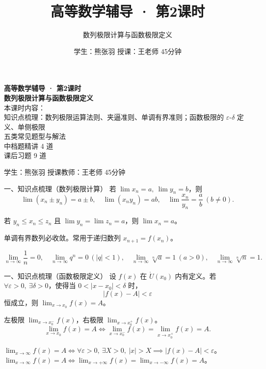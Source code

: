 \documentclass[aspectratio=169,11pt]{beamer}
\title{高等数学辅导 · 第2课时}
\subtitle{数列极限计算与函数极限定义}
\author{学生：熊张羽 \quad 授课：王老师 \quad 45分钟}
\date{}
\begin{document}
\begin{frame}
\vspace{1.2cm}
{\color{navy}\bfseries\Huge 高等数学辅导 · 第2课时}\\[1.2em]
{\color{blacktext}\bfseries\LARGE 数列极限计算与函数极限定义}\\[1.6em]
{\color{graytext}
本课时内容：\\[0.3em]
知识点梳理：数列极限运算法则、夹逼准则、单调有界准则；函数极限的 $\varepsilon$-$\delta$ 定义、单侧极限\\
五类常见题型与解法\\
中档题精讲 4 道\\
课后习题 9 道
}
\vspace{1.4em}

{\color{graytext} 学生：熊张羽 \quad 授课教师：王老师 \quad 45分钟}
\end{frame}

\begin{frame}{一、知识点梳理（数列极限计算）}
若 $\lim x_n=a,\ \lim y_n=b$，则
\[
\lim(x_n\pm y_n)=a\pm b,\quad \lim(x_n y_n)=ab,\quad \lim\frac{x_n}{y_n}=\frac ab\ (b\ne 0).
\]

若 $y_n\le x_n\le z_n$ 且 $\lim y_n=\lim z_n=a$，则 $\lim x_n=a$。

单调有界数列必收敛。常用于递归数列 $x_{n+1}=f(x_n)$。

\[
\lim_{n\to\infty}\frac1n=0,\quad \lim_{n\to\infty}q^n=0\ (|q|<1),\quad \lim_{n\to\infty}\sqrt[n]{a}=1\ (a>0),\quad \lim_{n\to\infty}\sqrt[n]{n}=1.
\]
\end{frame}

\begin{frame}{一、知识点梳理（函数极限定义）}
设 $f(x)$ 在 $\mathring{U}(x_0)$ 内有定义。若 $\forall\varepsilon>0,\ \exists\delta>0$，使得当 $0<|x-x_0|<\delta$ 时，
\[
|f(x)-A|<\varepsilon
\]
恒成立，则 $\displaystyle\lim_{x\to x_0}f(x)=A$。


左极限 $\displaystyle\lim_{x\to x_0^-}f(x)$，右极限 $\displaystyle\lim_{x\to x_0^+}f(x)$。
\[
\lim_{x\to x_0}f(x)=A \iff \lim_{x\to x_0^-}f(x)=\lim_{x\to x_0^+}f(x)=A.
\]

$\displaystyle\lim_{x\to\infty}f(x)=A \iff \forall\varepsilon>0,\ \exists X>0,\ |x|>X\implies |f(x)-A|<\varepsilon$。
$\displaystyle\lim_{x\to\infty}f(x)=A \iff \lim_{x\to+\infty}f(x)=\lim_{x\to-\infty}f(x)=A$。
\end{frame}
\end{document}
